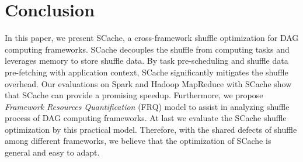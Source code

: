 \section{Conclusion}
In this paper, we present SCache, a cross-framework shuffle optimization for DAG computing frameworks. 
SCache decouples the shuffle from computing tasks and leverages memory to store shuffle data. 
By task pre-scheduling and shuffle data pre-fetching with application context, SCache significantly mitigates the shuffle overhead. 
{\color{blue}
Our evaluations on Spark and Hadoop MapReduce with SCache show that SCache can provide a promising speedup. 
Furthermore, we propose \textit{Framework Resources Quantification} (FRQ) model to assist in analyzing shuffle process of DAG computing frameworks. At last we evaluate the SCache shuffle optimization by this practical model.
Therefore, with the shared defects of shuffle among different frameworks, we believe that the optimization of SCache is general and easy to adapt. 
}

